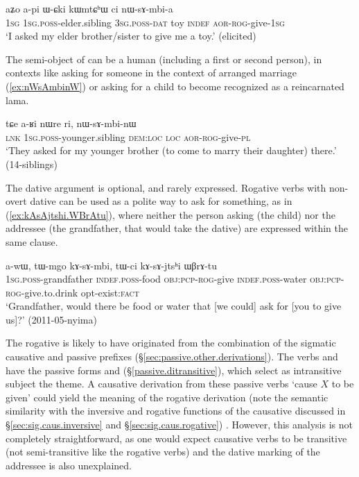 \begin{exe}
\ex \label{ex:nWsAmbia}
\gll aʑo a-pi ɯ-ɕki kɯmtɕʰɯ ci nɯ-sɤ-mbi-a \\
\textsc{1sg} \textsc{1sg}.\textsc{poss}-elder.sibling \textsc{3sg}.\textsc{poss}-\textsc{dat} toy \textsc{indef} \textsc{aor}-\textsc{rog}-give-\textsc{1sg} \\
\glt `I asked my elder brother/sister to give me a toy.' (elicited)
\end{exe}

The semi-object of  can be a human (including a first or second person), in contexts like asking for someone in the context of arranged marriage (\ref{ex:nWsAmbinW}) or asking for a child to become recognized as a reincarnated lama.

\begin{exe}
\ex \label{ex:nWsAmbinW}
\gll tɕe a-ʁi nɯre ri, nɯ-sɤ-mbi-nɯ \\
\textsc{lnk} \textsc{1sg}.\textsc{poss}-younger.sibling \textsc{dem}:\textsc{loc} \textsc{loc} \textsc{aor}-\textsc{rog}-give-\textsc{pl} \\
\glt `They asked for my younger brother (to come to marry their daughter) there.' (14-siblings) 
\end{exe}

The dative argument is optional, and rarely expressed. Rogative verbs with non-overt dative can be used as a polite way to ask for something, as in  (\ref{ex:kAsAjtshi.WBrAtu}), where neither the person asking (the child) nor the addressee (the grandfather, that would take the dative) are expressed within the same clause.

\begin{exe}
\ex \label{ex:kAsAjtshi.WBrAtu}
\gll  a-wɯ, tɯ-mgo kɤ-sɤ-mbi, tɯ-ci kɤ-sɤ-jtsʰi ɯβrɤ-tu \\
\textsc{1sg}.\textsc{poss}-grandfather \textsc{indef}.\textsc{poss}-food \textsc{obj}:\textsc{pcp}-\textsc{rog}-give \textsc{indef}.\textsc{poss}-water \textsc{obj}:\textsc{pcp}-\textsc{rog}-give.to.drink opt-exist:\textsc{fact} \\
\glt `Grandfather, would there be food or water that [we could] ask for [you to give us]?' (2011-05-nyima)
\end{exe}

The rogative  is likely to have originated from the combination of the sigmatic causative   and passive    prefixes (§\ref{sec:passive.other.derivations}). The verbs  and   have the passive forms  and   (§\ref{passive.ditransitive}), which select as intransitive subject the theme. A causative derivation from these passive verbs `cause $X$ to be given' could yield the meaning of the rogative derivation (note the semantic similarity with the inversive and rogative functions of the causative discussed in §\ref{sec:sig.caus.inversive} and §\ref{sec:sig.caus.rogative}) . However, this analysis is not completely straightforward, as one would expect causative verbs to be transitive (not semi-transitive like the rogative verbs) and the dative marking of the addressee is also unexplained.


